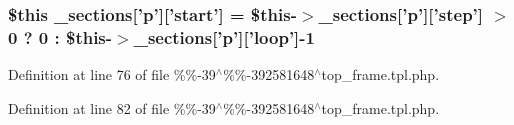 {{{{{{{{{{{{{{{{{{\subsubsection[{\-\_\-sections}]{\setlength{\rightskip}{0pt plus 5cm}\$this {\bf \-\_\-sections}\mbox{[}'p'\mbox{]}\mbox{[}'start'\mbox{]} = \$this-\/$>${\bf \-\_\-sections}\mbox{[}'p'\mbox{]}\mbox{[}'step'\mbox{]} $>$ 0 ? 0 \-: \$this-\/$>${\bf \-\_\-sections}\mbox{[}'p'\mbox{]}\mbox{[}'loop'\mbox{]}-\/1}}\label{_06_06-39_05_06_06-392581648_05top__frame_8tpl_8php_a6fedf9177032a51c081909aa685397f0}


\-Definition at line 76 of file \%\%-\/39$^\wedge$\%\%-\/392581648$^\wedge$top\-\_\-frame.\-tpl.\-php.

\hypertarget{_06_06-39_05_06_06-392581648_05top__frame_8tpl_8php_a9be4afc555d1189dc955c61df23e26b7}{
\index{\-\_\-sections@{\-\_\-sections}!%
\subsubsection[{\-\_\-sections}]{\setlength{\rightskip}{0pt plus 5cm}{\bf if} (\$this-\/$>${\bf \-\_\-sections}\mbox{[}'p'\mbox{]}\mbox{[}'show'\mbox{]}) {\bf else} \$this {\bf \-\_\-sections}\mbox{[}'p'\mbox{]}\mbox{[}'total'\mbox{]} = 0}}\label{_06_06-39_05_06_06-392581648_05top__frame_8tpl_8php_a9be4afc555d1189dc955c61df23e26b7}


\-Definition at line 82 of file \%\%-\/39$^\wedge$\%\%-\/392581648$^\wedge$top\-\_\-frame.\-tpl.\-php.

\hypertarget{_06_06-39_05_06_06-392581648_05top__frame_8tpl_8php_ae3518934be296cfd855fa76350ecae24}{
\index{\-\_\-sections@{\-\_\-sections}!%
}}}}}}}}}}}}}}}}}}}}
